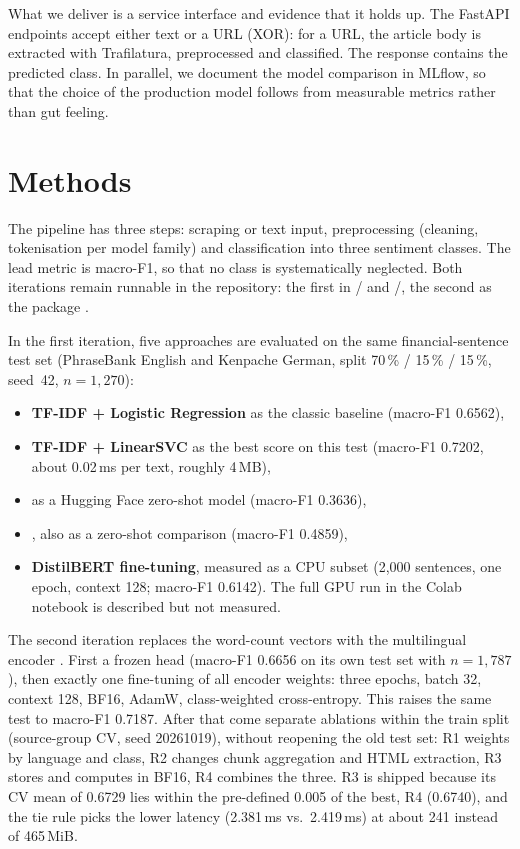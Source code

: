 \documentclass[12pt,toc=bib,toc=listof]{scrreprt}
\begin{document}
What we deliver is a service interface and evidence that it holds up. The FastAPI endpoints accept either text or a URL (XOR): for a URL, the article body is extracted with Trafilatura, preprocessed and classified. The response contains the predicted class. In parallel, we document the model comparison in MLflow, so that the choice of the production model follows from measurable metrics rather than gut feeling.

\section{Methods}

The pipeline has three steps: scraping or text input, preprocessing (cleaning, tokenisation per model family) and classification into three sentiment classes. The lead metric is macro-F1, so that no class is systematically neglected. Both iterations remain runnable in the repository: the first in / and /, the second as the package .

In the first iteration, five approaches are evaluated on the same financial-sentence test set (PhraseBank English and Kenpache German, split 70\,\% / 15\,\% / 15\,\%, seed~42, $n=1{,}270$):

\begin{itemize}
  \item \textbf{TF-IDF + Logistic Regression} as the classic baseline (macro-F1 0.6562),
  \item \textbf{TF-IDF + LinearSVC} as the best score on this test (macro-F1 0.7202, about 0.02\,ms per text, roughly 4\,MB),
  \item \textbf{} as a Hugging Face zero-shot model (macro-F1 0.3636),
  \item \textbf{}, also as a zero-shot comparison (macro-F1 0.4859),
  \item \textbf{DistilBERT fine-tuning}, measured as a CPU subset (2{,}000 sentences, one epoch, context 128; macro-F1 0.6142). The full GPU run in the Colab notebook is described but not measured.
\end{itemize}

The second iteration replaces the word-count vectors with the multilingual encoder . First a frozen head (macro-F1 0.6656 on its own test set with $n=1{,}787$), then exactly one fine-tuning of all encoder weights: three epochs, batch 32, context 128, BF16, AdamW, class-weighted cross-entropy. This raises the same test to macro-F1 0.7187. After that come separate ablations within the train split (source-group CV, seed 20261019), without reopening the old test set: R1 weights by language and class, R2 changes chunk aggregation and HTML extraction, R3 stores and computes in BF16, R4 combines the three. R3 is shipped because its CV mean of 0.6729 lies within the pre-defined 0.005 of the best, R4 (0.6740), and the tie rule picks the lower latency (2.381\,ms vs.\ 2.419\,ms) at about 241 instead of 465\,MiB.
\end{document}
